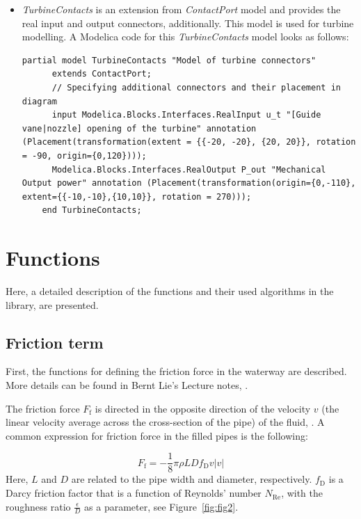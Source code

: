 \documentclass[%
]{USN-PhD}
\begin{document}
\begin{itemize}
    \item \emph{TurbineContacts} is an extension from \emph{ContactPort} model and provides the real input and output connectors, additionally. This model is used for turbine modelling. A Modelica code for this \emph{TurbineContacts} model looks as follows:
    \begin{lstlisting}[language = modelica]
    partial model TurbineContacts "Model of turbine connectors"
      extends ContactPort;
      // Specifying additional connectors and their placement in diagram
      input Modelica.Blocks.Interfaces.RealInput u_t "[Guide vane|nozzle] opening of the turbine" annotation (Placement(transformation(extent = {{-20, -20}, {20, 20}}, rotation = -90, origin={0,120})));
      Modelica.Blocks.Interfaces.RealOutput P_out "Mechanical Output power" annotation (Placement(transformation(origin={0,-110}, extent={{-10,-10},{10,10}}, rotation = 270)));
    end TurbineContacts;
    \end{lstlisting}
\end{itemize}

\section{Functions}

Here, a detailed description of the functions and their used algorithms in the library, are presented.

\subsection{Friction term}

First, the functions for defining the friction force in the waterway are described. More details can be found in Bernt Lie's Lecture notes, \cite{LieL:18}.

The friction force $F_\mathrm{f}$ is directed in the opposite direction of the velocity $v$ (the linear velocity average across the cross-section of the pipe) of the fluid, \cite{LieL:18}. A common expression for friction force in the filled pipes is the following:

\begin{equation}\label{eq:eq1}
    F_\mathrm{f}=-\frac{1}{8}\pi\rho LDf_\mathrm{D}v|v|
\end{equation}
Here, $L$ and $D$ are related to the pipe width and diameter, respectively. $f_\mathrm{D}$ is a Darcy friction factor that is a function of Reynolds' number $N_\mathrm{Re}$, with the roughness ratio $\frac{\epsilon}{D}$ as a parameter, see Figure~\ref{fig:fig2}.
\end{document}
